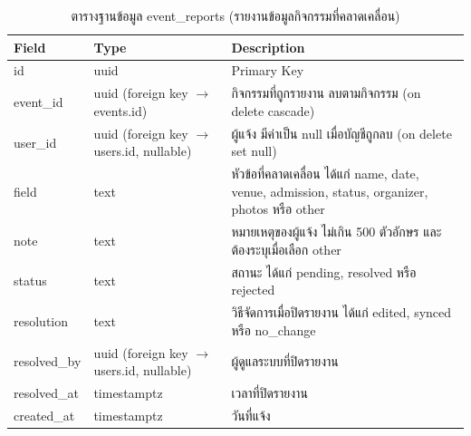 \begin{table}[H]
\centering
\caption{ตารางฐานข้อมูล event\_reports (รายงานข้อมูลกิจกรรมที่คลาดเคลื่อน)}
\label{tab:db_eventreports}
\begin{tabular}{|p{3.6cm}|p{2.6cm}|p{6.8cm}|}
\hline
\textbf{Field} & \textbf{Type} & \textbf{Description} \\
\hline
id & uuid & Primary Key \\ \hline
event\_id & uuid (foreign key $\to$ events.id) & กิจกรรมที่ถูกรายงาน ลบตามกิจกรรม (on delete cascade) \\ \hline
user\_id & uuid (foreign key $\to$ users.id, nullable) & ผู้แจ้ง มีค่าเป็น null เมื่อบัญชีถูกลบ (on delete set null) \\ \hline
field & text & หัวข้อที่คลาดเคลื่อน ได้แก่ name, date, venue, admission, status, organizer, photos หรือ other \\ \hline
note & text & หมายเหตุของผู้แจ้ง ไม่เกิน 500 ตัวอักษร และต้องระบุเมื่อเลือก other \\ \hline
status & text & สถานะ ได้แก่ pending, resolved หรือ rejected \\ \hline
resolution & text & วิธีจัดการเมื่อปิดรายงาน ได้แก่ edited, synced หรือ no\_change \\ \hline
resolved\_by & uuid (foreign key $\to$ users.id, nullable) & ผู้ดูแลระบบที่ปิดรายงาน \\ \hline
resolved\_at & timestamptz & เวลาที่ปิดรายงาน \\ \hline
created\_at & timestamptz & วันที่แจ้ง \\
\hline
\end{tabular}
\end{table}

